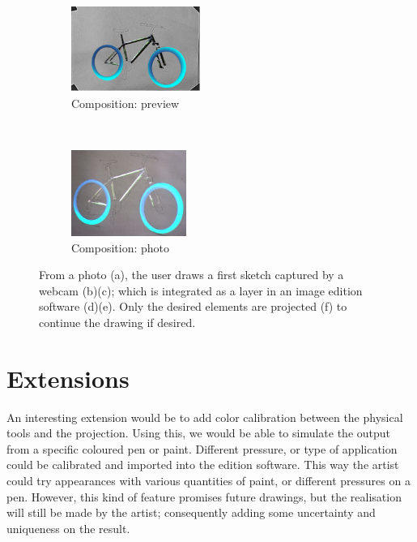 \documentclass{article}
\begin{document}
\begin{figure}[!htb]
\begin{subfigure}[b]{0.20\textwidth}
                \label{fig:gimp1}
        \end{subfigure}
        \\
        \begin{subfigure}[b]{0.20\textwidth}
                \centering
                \includegraphics[height= 2.8cm]{mix2}
                \caption{Composition: preview}
                \label{fig:gimp2}
        \end{subfigure}
        ~ \hspace{4mm}
        \begin{subfigure}[b]{0.20\textwidth}
                \centering
                \includegraphics[height= 2.8cm]{velo2}
                \caption{Composition: photo}
                \label{fig:proj}
        \end{subfigure}
        \caption{From a photo (a), the user draws a first sketch captured by a webcam (b)(c); which is integrated as a layer in an image edition software (d)(e). Only the desired elements are projected (f) to continue the drawing if desired.}\label{fig:velo6illu}
\end{figure}


\section{Extensions}

An interesting extension would be to add color calibration between the physical tools and the projection. Using this, we would be able to simulate the output from a specific coloured pen or paint. Different pressure, or type of application could be calibrated and imported into the edition software. This way the artist could try appearances with various quantities of paint, or different pressures on a pen. However, this kind of feature promises future drawings, but the realisation will still be made by the artist; consequently adding some uncertainty and uniqueness on the result. 
\end{document}
